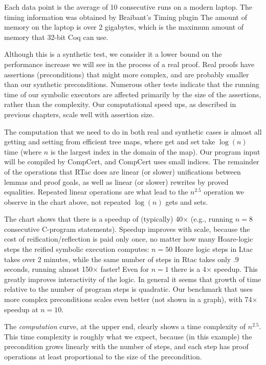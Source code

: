 \documentclass{puthesis}
\begin{document}
Each data point is the average of 10 consecutive runs on a modern
laptop.  The timing information was obtained by Braibant's Timing
plugin \cite{braibant:timing} The amount of memory on the laptop is
over 2 gigabytes, which is the maximum amount of memory that 32-bit
Coq can use. 

Although this is a synthetic test, we consider it a lower bound on the
performance increase we will see in the process of a real proof.  Real
proofs have assertions (preconditions) that might more complex, and
are probably smaller than our synthetic preconditions.  Numerous other
tests indicate that the running time of our symbolic executors are
affected primarily by the size of the assertions, rather than the
complexity. Our computational speed ups, as described in previous
chapters, scale well with assertion size. 

The computation that we need to do in both real and synthetic cases is
almost all getting and setting from efficient tree maps, where get and
set take $\log(n)$ time (where $n$ is the largest index in the domain
of the map). Our program input will be compiled by CompCert, and
CompCert uses small indices. The remainder of the operations that RTac
does are linear (or slower) unifications between lemmas and proof
goals, as well as linear (or slower) rewrites by proved
equalities. Repeated linear operations are what lead to the $n^{2.5}$
operation we observe in the chart above, not repeated $\log(n)$ gets
and sets.

The chart shows that there is a speedup of (typically) 40$\times$
(e.g., running $n\! = \! 8$ consecutive C-program statements).
Speedup improves with scale, because the cost of
reification/reflection is paid only once, no matter how many
Hoare-logic steps the reified symbolic execution computes: $n\! =\!
50$ Hoare logic steps in Ltac takes over 2 minutes, while the same
number of steps in Rtac takes only .9 seconds, running almost
150$\times$ faster!  Even for $n\!=\!1$ there is a 4$\times$ speedup.
This greatly improves interactivity of the logic. In general it seems
that growth of time relative to the number of program steps is
quadratic. Our benchmark that uses more complex preconditions scales
even better (not shown in a graph), with 74$\times$ speedup at $n\! =
\!10$.


The \emph{computation} curve, at the upper end, clearly
shows a time complexity of $n^{2.5}$.
This time complexity is roughly what we expect,
because (in this example) the
precondition grows linearly with the number of steps,
and each step has proof operations at least proportional to the size
of the precondition.
\end{document}
